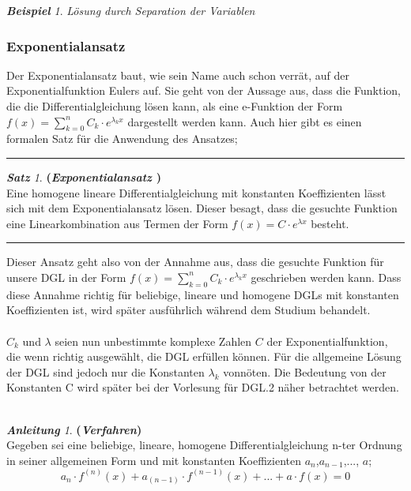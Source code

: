 \documentclass[a4paper,11pt]{article}
\theoremstyle{remark}
\newtheorem{example}{\textbf{Beispiel}}[section]
\newtheorem{sentence}{\textbf{Satz}}[section]
\newtheorem{guide}{\textbf{Anleitung}}[section]
\begin{document}
\begin{example}{\textit{Lösung durch Separation der Variablen}}
\subsubsection{Exponentialansatz}
Der Exponentialansatz baut, wie sein Name auch schon verrät, auf der Exponentialfunktion Eulers auf. Sie geht von der Aussage aus, dass die Funktion, die die Differentialgleichung lösen kann, als eine e-Funktion der Form $f(x)=\sum_{k=0}^n C_k\cdot e^{\lambda _kx}$ dargestellt werden kann. Auch hier gibt es einen formalen Satz für die Anwendung des Ansatzes;
\begin{center}
\begin{flushleft}
\rule{8cm}{0,01cm}
\end{flushleft}
\begin{sentence}{\textbf{(\textit{Exponentialansatz \cite{2}})}} \\
Eine homogene lineare Differentialgleichung mit konstanten Koeffizienten lässt sich mit dem Exponentialansatz lösen. Dieser besagt, dass die gesuchte Funktion eine Linearkombination aus Termen der Form $f(x)=C\cdot e^{\lambda x}$ besteht.
\end{sentence}
\begin{flushleft}
\rule{8cm}{0,01cm}
\end{flushleft}
\end{center}
Dieser Ansatz geht also von der Annahme aus, dass die gesuchte Funktion für unsere DGL in der Form $f(x)=\sum_{k=0}^n C_k\cdot e^{\lambda _kx}$ geschrieben werden kann. Dass diese Annahme richtig für beliebige, lineare und homogene DGLs mit konstanten Koeffizienten ist, wird später ausführlich während dem Studium behandelt. \\ \\ $C_k$ und $\lambda$ seien nun unbestimmte komplexe Zahlen $C$ der Exponentialfunktion, die wenn richtig ausgewählt, die DGL erfüllen können. Für die allgemeine Lösung der DGL sind jedoch nur die Konstanten $\lambda_k$ vonnöten. Die Bedeutung von der Konstanten C wird später bei der Vorlesung für DGL.2 näher betrachtet werden. \\ \\
\begin{guide}{\textbf{(\textit{Verfahren})}} \\
Gegeben sei eine beliebige, lineare, homogene Differentialgleichung n-ter Ordnung in seiner allgemeinen Form und mit konstanten Koeffizienten $a_n$,$a_{n-1}$,..., $a$;
\begin{equation}
a_n\cdot f^{(n)}(x)+a_{(n-1)}\cdot f^{(n-1)}(x)+...+a\cdot f(x)=0

\end{equation}
\end{guide}
\end{example}
\end{document}
